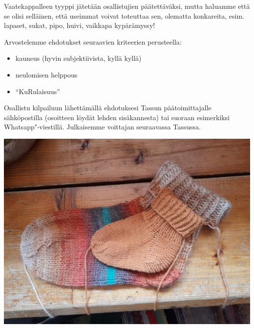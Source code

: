 Vaatekappalleen tyyppi jätetään osallistujien päätettäväksi, mutta haluamme
että se olisi selläinen, että useimmat voivat toteuttaa sen, olematta
konkareita, esim. lapaset, sukat, pipo, huivi, vaikkapa kypärämyssy!

\bigskip
\noindent Arvostelemme ehdotukset seuraavien kriteerien perusteella:
\vspace{-0.16cm}
\begin{itemize}
\setlength\itemsep{-0.16cm}
\setlength\itemindent{0.64cm}
\item kauneus (hyvin subjektiivista, kyllä kyllä)
\item neulomisen helppous
\item ``KuRulaisuus''
\end{itemize}

\smallskip
Osallistu kilpailuun lähettämällä ehdotuksesi Tassun päätoimittajalle
sähköpostilla (osoitteen löydät lehden sisäkannesta) tai suoraan esimerkiksi
Whatsapp"-viestillä. Julkaisemme voittajan seuraavassa Tassussa.

\vspace{0.32cm}
\begin{center}
	\noindent\includegraphics[width=0.8\linewidth,trim={0 9cm 0 9cm},clip]{assets/neulekilpailu2}
\end{center}
